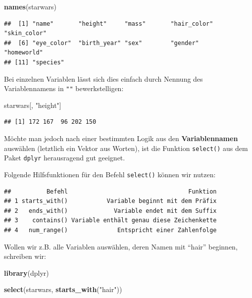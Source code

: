 \documentclass[
]{book}
\newenvironment{Shaded}{\begin{snugshade}}{\end{snugshade}}
\newcommand{\FunctionTok}[1]{\textcolor[rgb]{0.13,0.29,0.53}{\textbf{#1}}}
\newcommand{\NormalTok}[1]{#1}
\newcommand{\StringTok}[1]{\textcolor[rgb]{0.31,0.60,0.02}{#1}}
\begin{document}
\begin{Shaded}
\begin{Highlighting}[]
\FunctionTok{names}\NormalTok{(starwars)}
\end{Highlighting}
\end{Shaded}

\begin{verbatim}
##  [1] "name"       "height"     "mass"       "hair_color" "skin_color"
##  [6] "eye_color"  "birth_year" "sex"        "gender"     "homeworld" 
## [11] "species"
\end{verbatim}

Bei einzelnen Variablen lässt sich dies einfach durch Nennung des Variablennamens in \texttt{""} bewerkstelligen:

\begin{Shaded}
\begin{Highlighting}[]
\NormalTok{starwars[, }\StringTok{"height"}\NormalTok{]}
\end{Highlighting}
\end{Shaded}

\begin{verbatim}
## [1] 172 167  96 202 150
\end{verbatim}

Möchte man jedoch nach einer bestimmten Logik aus den \textbf{Variablennamen} auswählen (letztlich ein Vektor aus Worten), ist die Funktion \texttt{select()} aus dem Paket \texttt{dplyr} herausragend gut geeignet.

Folgende Hilfsfunktionen für den Befehl \texttt{select()} können wir nutzen:

\begin{verbatim}
##          Befehl                                  Funktion
## 1 starts_with()           Variable beginnt mit dem Präfix
## 2   ends_with()             Variable endet mit dem Suffix
## 3    contains() Variable enthält genau diese Zeichenkette
## 4   num_range()              Entspricht einer Zahlenfolge
\end{verbatim}

Wollen wir z.B. alle Variablen auswählen, deren Namen mit ``hair'' beginnen, schreiben wir:

\begin{Shaded}
\begin{Highlighting}[]
\FunctionTok{library}\NormalTok{(dplyr)}

\FunctionTok{select}\NormalTok{(starwars, }\FunctionTok{starts\_with}\NormalTok{(}\StringTok{"hair"}\NormalTok{))}
\end{Highlighting}
\end{Shaded}
\end{document}
